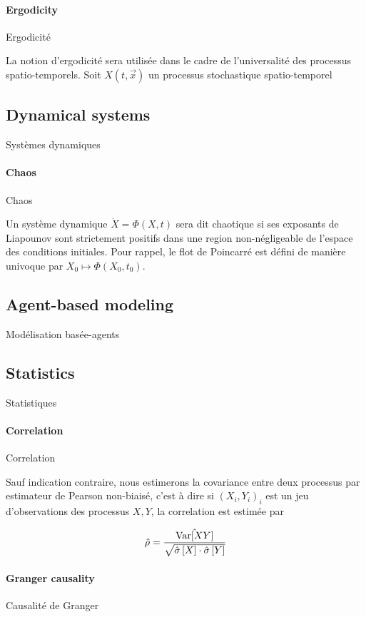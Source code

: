 \paragraph{Ergodicity}{Ergodicité}

La notion d'ergodicité sera utilisée dans le cadre de l'universalité des processus spatio-temporels. Soit $X(t,\vec{x})$ un processus stochastique spatio-temporel



\subsection*{Dynamical systems}{Systèmes dynamiques}

\paragraph{Chaos}{Chaos}


Un système dynamique $\dot{X}=\Phi(X,t)$ sera dit chaotique si ses exposants de Liapounov sont strictement positifs dans une region non-négligeable de l'espace des conditions initiales. Pour rappel, le flot de Poincarré est défini de manière univoque par $X_0 \mapsto \Phi(X_0,t_0)$.


\subsection*{Agent-based modeling}{Modélisation basée-agents}





\subsection*{Statistics}{Statistiques}


\paragraph{Correlation}{Correlation}

Sauf indication contraire, nous estimerons la covariance entre deux processus par estimateur de Pearson non-biaisé, c'est à dire si $(X_i,Y_i)_i$ est un jeu d'observations des processus $X,Y$, la correlation est estimée par

\[
\hat{\rho} = \frac{\hat{\operatorname{Var}\!\left[XY\right]}}{\sqrt{\hat{\sigma} \left[X\right] \cdot \hat{\sigma}\left[Y\right]}}
\]




\paragraph{Granger causality}{Causalité de Granger}


